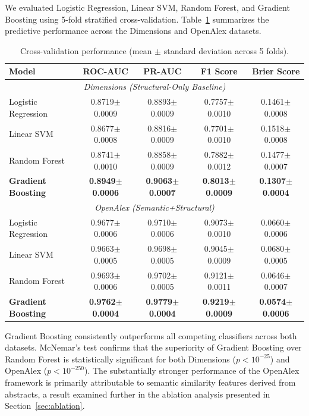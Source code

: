 \documentclass[11pt,a4paper]{article}
\begin{document}
We evaluated Logistic Regression, Linear SVM, Random Forest, and Gradient Boosting using 5-fold stratified cross-validation. Table~\ref{tab:cv} summarizes the predictive performance across the Dimensions and OpenAlex datasets.

\begin{table}[H]
\centering
\caption{Cross-validation performance (mean $\pm$ standard deviation across 5 folds).}
\label{tab:cv}
\begin{tabular}{lcccc}
\toprule
\textbf{Model} & \textbf{ROC-AUC} & \textbf{PR-AUC} & \textbf{F1 Score} & \textbf{Brier Score} \\
\midrule
\multicolumn{5}{c}{\textit{Dimensions (Structural-Only Baseline)}} \\
Logistic Regression & 0.8719$\pm$0.0009 & 0.8893$\pm$0.0009 & 0.7757$\pm$0.0010 & 0.1461$\pm$0.0008 \\
Linear SVM & 0.8677$\pm$0.0008 & 0.8816$\pm$0.0009 & 0.7701$\pm$0.0010 & 0.1518$\pm$0.0008 \\
Random Forest & 0.8741$\pm$0.0010 & 0.8858$\pm$0.0009 & 0.7882$\pm$0.0012 & 0.1477$\pm$0.0007 \\
\textbf{Gradient Boosting} & \textbf{0.8949$\pm$0.0006} & \textbf{0.9063$\pm$0.0007} & \textbf{0.8013$\pm$0.0009} & \textbf{0.1307$\pm$0.0004} \\
\midrule
\multicolumn{5}{c}{\textit{OpenAlex (Semantic+Structural)}} \\
Logistic Regression & 0.9677$\pm$0.0006 & 0.9710$\pm$0.0006 & 0.9073$\pm$0.0010 & 0.0660$\pm$0.0006 \\
Linear SVM & 0.9663$\pm$0.0005 & 0.9698$\pm$0.0005 & 0.9045$\pm$0.0009 & 0.0680$\pm$0.0005 \\
Random Forest & 0.9693$\pm$0.0006 & 0.9702$\pm$0.0005 & 0.9121$\pm$0.0011 & 0.0646$\pm$0.0007 \\
\textbf{Gradient Boosting} & \textbf{0.9762$\pm$0.0004} & \textbf{0.9779$\pm$0.0004} & \textbf{0.9219$\pm$0.0009} & \textbf{0.0574$\pm$0.0006} \\
\bottomrule
\end{tabular}
\end{table}

Gradient Boosting consistently outperforms all competing classifiers across both datasets. McNemar's test confirms that the superiority of Gradient Boosting over Random Forest is statistically significant for both Dimensions (\(p < 10^{-25}\)) and OpenAlex (\(p < 10^{-250}\)). The substantially stronger performance of the OpenAlex framework is primarily attributable to semantic similarity features derived from abstracts, a result examined further in the ablation analysis presented in Section~\ref{sec:ablation}.
\end{document}
